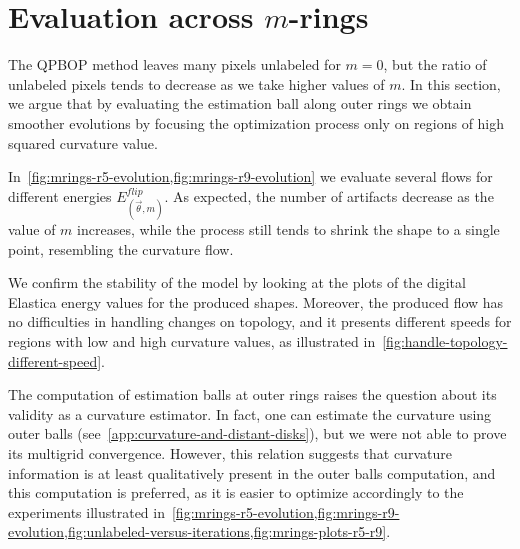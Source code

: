 \section{Evaluation across $m$-rings}
\label{ch7:sec:evaluation-across-rings}

The QPBOP method leaves many pixels unlabeled for $m=0$, but the ratio of unlabeled pixels tends to decrease as we take higher values of $m$. In this section, we argue that by evaluating the estimation ball along outer rings we obtain smoother evolutions by focusing the optimization process only on regions of high squared curvature value.

In~\cref{fig:mrings-r5-evolution,fig:mrings-r9-evolution} we evaluate several flows for different energies $E_{(\vec{\theta},m)}^{flip}$. As expected, the number of artifacts decrease as the value of $m$ increases, while the process still tends to shrink the shape to a single point, resembling the curvature flow. 

We confirm the stability of the model by looking at the plots of the digital Elastica energy values for the produced shapes. Moreover, the produced flow has no difficulties in handling changes on topology, and it presents different speeds for regions with low and high curvature values, as illustrated in~\cref{fig:handle-topology-different-speed}.

The computation of estimation balls at outer rings raises the question about its validity as a curvature estimator. In fact, one can estimate the curvature using outer balls (see~\cref{app:curvature-and-distant-disks}), but we were not able to prove its multigrid convergence. However, this relation suggests that curvature information is at least qualitatively present in the outer balls computation, and this computation is preferred, as it is easier to optimize accordingly to the experiments illustrated in~\cref{fig:mrings-r5-evolution,fig:mrings-r9-evolution,fig:unlabeled-versus-iterations,fig:mrings-plots-r5-r9}.

